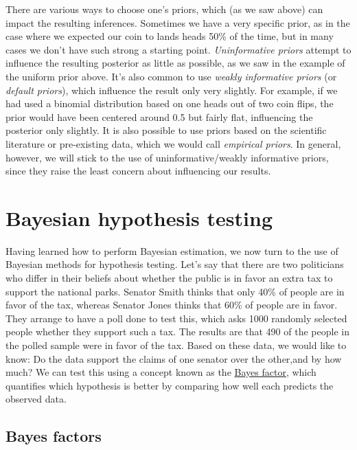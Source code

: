 \documentclass[
  12pt,
]{book}
\begin{document}
There are various ways to choose one's priors, which (as we saw above) can impact the resulting inferences. Sometimes we have a very specific prior, as in the case where we expected our coin to lands heads 50\% of the time, but in many cases we don't have such strong a starting point. \emph{Uninformative priors} attempt to influence the resulting posterior as little as possible, as we saw in the example of the uniform prior above. It's also common to use \emph{weakly informative priors} (or \emph{default priors}), which influence the result only very slightly. For example, if we had used a binomial distribution based on one heads out of two coin flips, the prior would have been centered around 0.5 but fairly flat, influencing the posterior only slightly. It is also possible to use priors based on the scientific literature or pre-existing data, which we would call \emph{empirical priors}. In general, however, we will stick to the use of uninformative/weakly informative priors, since they raise the least concern about influencing our results.

\hypertarget{bayesian-hypothesis-testing}{%
\section{Bayesian hypothesis testing}\label{bayesian-hypothesis-testing}}

Having learned how to perform Bayesian estimation, we now turn to the use of Bayesian methods for hypothesis testing. Let's say that there are two politicians who differ in their beliefs about whether the public is in favor an extra tax to support the national parks. Senator Smith thinks that only 40\% of people are in favor of the tax, whereas Senator Jones thinks that 60\% of people are in favor. They arrange to have a poll done to test this, which asks 1000 randomly selected people whether they support such a tax. The results are that 490 of the people in the polled sample were in favor of the tax. Based on these data, we would like to know: Do the data support the claims of one senator over the other,and by how much? We can test this using a concept known as the \href{https://bayesfactor.blogspot.com/2014/02/the-bayesfactor-package-this-blog-is.html}{Bayes factor}, which quantifies which hypothesis is better by comparing how well each predicts the observed data.

\hypertarget{Bayes-factors}{%
\subsection{Bayes factors}\label{Bayes-factors}}
\end{document}
